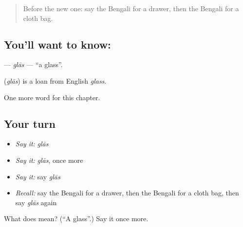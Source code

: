 \label{lesson:BN-C201-glas}



\begin{quote}
Before the new one: say the Bengali for a drawer, then the Bengali for a cloth bag.
\end{quote}

\subsection*{You'll want to know: }
\textbf{} — \emph{glās} — \textquotedblleft{}a glass\textquotedblright{}.

\begin{cousinweb}
\textbf{} (\emph{glās}) is a loan from English \emph{glass}.
\end{cousinweb}

\begin{grammarlens}[title={What you've built}]
One more word for this chapter.
\end{grammarlens}

\subsection*{Your turn}
\begin{itemize}
\raggedright
  \item \emph{Say it:} \emph{glās}
  \item \emph{Say it:} \emph{glās}, once more
  \item \emph{Say it:} say \emph{glās}
  \item \emph{Recall:} say the Bengali for a drawer, then the Bengali for a cloth bag, then say \emph{glās} again
\end{itemize}

\begin{tcolorbox}[breakable,colback=teal!4,colframe=teal!35!black,title={Before you move on}]
What does  mean? (\textquotedblleft{}A glass\textquotedblright{}.) Say it once more.
\end{tcolorbox}
